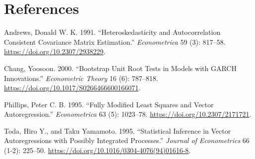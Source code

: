 \section*{References}\label{references}

\protect{}\label{refs}
\begin{CSLReferences}{1}{1}
Andrews, Donald W. K. 1991. {``Heteroskedasticity and Autocorrelation
Consistent Covariance Matrix Estimation.''} \emph{Econometrica} 59 (3):
817--58. \url{https://doi.org/10.2307/2938229}.

Chang, Yoosoon. 2000. {``Bootstrap Unit Root Tests in Models with
{GARCH} Innovations.''} \emph{Econometric Theory} 16 (6): 787--818.
\url{https://doi.org/10.1017/S0266466600166071}.

Phillips, Peter C. B. 1995. {``Fully Modified Least Squares and Vector
Autoregression.''} \emph{Econometrica} 63 (5): 1023--78.
\url{https://doi.org/10.2307/2171721}.

Toda, Hiro Y., and Taku Yamamoto. 1995. {``Statistical Inference in
Vector Autoregressions with Possibly Integrated Processes.''}
\emph{Journal of Econometrics} 66 (1-2): 225--50.
\url{https://doi.org/10.1016/0304-4076(94)01616-8}.

\end{CSLReferences}

